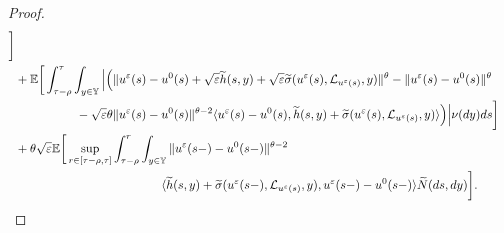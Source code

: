 \documentclass[11pt]{article}
\numberwithin{equation}{section}
\theoremstyle{plain}
\begin{document}
\begin{proof}
\begin{align}
                        \bigg]  \nonumber\\
      & + \mathbb{E}
                    \bigg[ \int_{\tau-\rho}^{\tau} 
                                 \int_{y \in \mathbb{Y} } 
                                    \Big |  \Bigl( \| u^{\varepsilon}(s) - u^0(s)
	                                              + \sqrt{\varepsilon}\widetilde{h}(s, y) 
	                                              + \sqrt{\varepsilon}
	                                                        \widetilde{\sigma}
	                                                              (u^{\varepsilon}(s), \mathcal{L}_{u^{\varepsilon}(s)}, y)
	                                           \|^{\theta}
      	                                       - \| u^{\varepsilon}(s) - u^0(s) \|^{\theta}  \nonumber\\
	  & \qquad\qquad\quad
	                                           - \sqrt{ \varepsilon} \theta 
	                                                                             \| u^{\varepsilon}(s) - u^0(s) \|^{\theta - 2}
	                                           \langle u^{\varepsilon}(s) - u^0(s),
	                                                        \widetilde{h}(s,y) 
	                                                        + \widetilde{\sigma}
	                                                               (u^{\varepsilon}(s), \mathcal{L}_{u^{\varepsilon}(s)}, y)
	                                           \rangle
	                                 \Bigr) \Big |
	                                  \nu(dy) ds   
	                  \bigg] \nonumber\\
      & + \theta \sqrt{\varepsilon} 
               \mathbb{E}
                        \bigg[ \sup_{r \in [\tau -\rho, \tau] }
                                     \int_{\tau-\rho}^{r} 
                                        \int_{y \in \mathbb{Y} } 
                                           \| u^{\varepsilon}(s-) - u^0(s-) \|^{\theta - 2}  \nonumber\\
      &\qquad\qquad\qquad\qquad\qquad\qquad                              
                                            \langle \widetilde{h}(s,y) 
                                            	         + \widetilde{\sigma}(u^{\varepsilon}(s-), \mathcal{L}_{u^{\varepsilon}(s)}, y),  
                                                         u^{\varepsilon}(s-) - u^0(s-) 
                                            \rangle  \widetilde{N}(ds, dy)
                        \bigg].
 \end{align}   
 

\end{proof}
\end{document}
